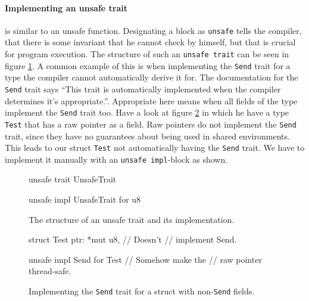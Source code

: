 \documentclass[twocolumn]{article}
\begin{document}
\paragraph{Implementing an unsafe trait} is similar to an unsafe function.
Designating a block as \texttt{unsafe} tells the compiler, that there is some invariant that he cannot check by himself, but that is crucial for program execution.
The structure of such an \texttt{unsafe trait} can be seen in figure \ref{unsafe-trait}.
A common example of this is when implementing the \texttt{Send} trait for a type the compiler cannot automatically derive it for.
The documentation for the \texttt{Send} trait says ``This trait is automatically implemented when the compiler determines it's appropriate.''\cite{RustDoc-Send}.
Appropriate here means when all fields of the type implement the \texttt{Send} trait too.
Have a look at figure \ref{unsafe-send} in which he have a type \texttt{Test} that has a raw pointer as a field.
Raw pointers do not implement the \texttt{Send} trait, since they have no guarantees about being used in shared environments.
This leads to our struct \texttt{Test} not automatically having the \texttt{Send} trait.
We have to implement it manually with an \texttt{unsafe impl}-block as shown.
\begin{figure}
\begin{rustcode}
unsafe trait UnsafeTrait {}

unsafe impl UnsafeTrait for u8 {}
\end{rustcode}
\vspace{-2em}
\caption{The structure of an unsafe trait and its implementation.}
\label{unsafe-trait}
\end{figure}
\begin{figure}
\begin{rustcode}
struct Test {
    ptr: *mut u8, // Doesn't
                  // implement Send.
}

unsafe impl Send for Test {
// Somehow make the
// raw pointer thread-safe.
}
\end{rustcode}
\vspace{-2em}
\caption{Implementing the \texttt{Send} trait for a struct with non-\texttt{Send} fields.}
\label{unsafe-send}
\end{figure}
\end{document}
